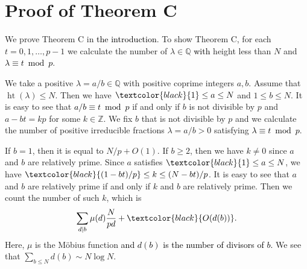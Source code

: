 \documentclass[a4paper, 11pt]{article}
\theoremstyle{plain}
\newcommand{\?}{\textcolor{red}{??}}
\newcommand{\lm}{\lambda}
\newcommand{\bQ}{\mathbb{Q}}
\newcommand{\bZ}{\mathbb{Z}}
\newcommand{\height}{\operatorname{ht}}
\begin{document}
\section{Proof of Theorem C}
\label{theoremc}

We prove Theorem C in \textcolor{black}{the introduction}. To show Theorem C, for each $t=0,1, \ldots,p-1$ we calculate the number of $\lm \in \bQ $ \textcolor{black}{with} height less than $N$ and \textcolor{black}{$\lm  \equiv t \bmod p$}. 

We take a positive $\lm=a/b \in \bQ$ with positive coprime integers $a,b$. Assume that $\height (\lm) \le N$. Then we have $\textcolor{black}{1} \le a\le N$ and $1 \le b \le N$. It is easy to see that \textcolor{black}{$a/b  \equiv t \bmod p$} if and only if $b$ is not divisible by $p$ and $a-bt =kp$ for some $k \in \bZ$. We fix $b$ that is not divisible by $p$ and we calculate the number of positive irreducible fractions $\lm=a/b>0$ satisfying \textcolor{black}{$\lm \equiv t \bmod p$}.

If $b=1$, then it is equal to $N/p + O(1)$. If $b \ge 2$, then we have $k \neq 0$ since $a$ and $b$ are relatively prime. Since $a$ satisfies $\textcolor{black}{1} \le a \le N$, we have $\textcolor{black}{(1-bt)/p} \le k \le (N-bt)/p$. It is easy to see that $a$ and $b$ are relatively prime if and only if $k$ and $b$ are relatively prime. Then we count the number of such $k$, which is
\[
\sum_{d \mid b}\mu(d) \frac{N}{pd} +\textcolor{black}{O(d(b))}.
\]
Here, $\mu$ is the M\"{o}bius function \textcolor{black}{and $d(b)$ is the number of divisors of $b$.} We see that $\sum_{b\le N}d(b) \sim N\log N$.
\end{document}
